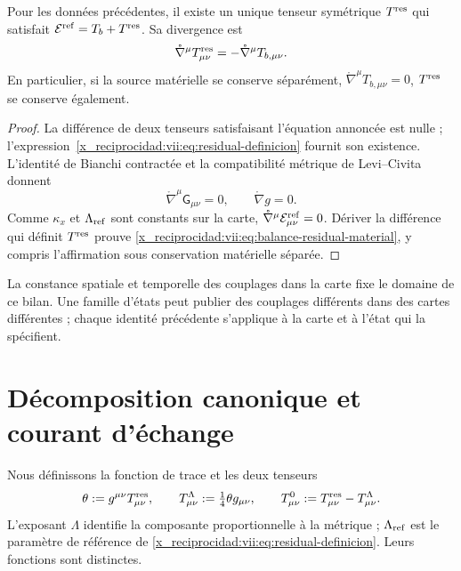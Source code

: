\begin{theorem}
\label{x_reciprocidad:vii:thm:residual-unicidad-balance}
Pour les données précédentes, il existe un unique tenseur symétrique \(T^{\rm res}\) qui satisfait \(\mathcal E^{\rm ref}=T_b+T^{\rm res}\). Sa divergence est
\begin{equation}
 \mathring\nabla^\mu T^{\rm res}_{\mu\nu}
 =-\mathring\nabla^\mu T_{b,\mu\nu}.
 \label{x_reciprocidad:vii:eq:balance-residual-material}
\end{equation}
En particulier, si la source matérielle se conserve séparément,
\(\mathring\nabla^\mu T_{b,\mu\nu}=0\), \(T^{\rm res}\)
se conserve également.
\end{theorem}
\begin{proof}
La différence de deux tenseurs satisfaisant l'équation annoncée est nulle ; l'expression~\eqref{x_reciprocidad:vii:eq:residual-definicion} fournit son existence. L'identité de Bianchi contractée et la compatibilité métrique de Levi--Civita donnent
\[
 \mathring\nabla^\mu\mathsf G_{\mu\nu}=0,
 \qquad \mathring\nabla g=0.
\]
Comme \(\kappa_x\) et \(\Lambda_{\rm ref}\) sont constants sur la
carte, \(\mathring\nabla^\mu\mathcal E^{\rm ref}_{\mu\nu}=0\).
Dériver la différence qui définit \(T^{\rm res}\) prouve
\eqref{x_reciprocidad:vii:eq:balance-residual-material}, y compris l'affirmation sous
conservation matérielle séparée.
\end{proof}

La constance spatiale et temporelle des couplages dans la carte fixe
le domaine de ce bilan. Une famille d'états peut publier
des couplages différents dans des cartes différentes ; chaque identité précédente
s'applique à la carte et à l'état qui la spécifient.

\section{Décomposition canonique et courant d'échange}
\label{x_reciprocidad:vii:subsec:traza-corriente-residual}

Nous définissons la fonction de trace et les deux tenseurs
\begin{equation}
 \theta:=g^{\mu\nu}T^{\rm res}_{\mu\nu},\qquad
 T^{\Lambda}_{\mu\nu}:=\tfrac14\theta g_{\mu\nu},\qquad
 T^{0}_{\mu\nu}:=T^{\rm res}_{\mu\nu}-T^{\Lambda}_{\mu\nu}.
 \label{x_reciprocidad:vii:eq:descomposicion-traza-residual}
\end{equation}
L'exposant \(\Lambda\) identifie la composante proportionnelle à la
métrique ; \(\Lambda_{\rm ref}\) est le paramètre de référence de
\eqref{x_reciprocidad:vii:eq:residual-definicion}. Leurs fonctions sont distinctes.

